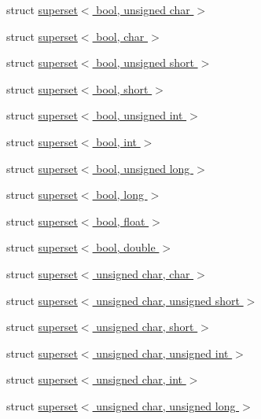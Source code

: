 \begin{DoxyCompactItemize}
struct \hyperlink{structcimg__library_1_1cimg_1_1superset_3_01bool_00_01unsigned_01char_01_4}{superset$<$ bool, unsigned char $>$}
\item 
struct \hyperlink{structcimg__library_1_1cimg_1_1superset_3_01bool_00_01char_01_4}{superset$<$ bool, char $>$}
\item 
struct \hyperlink{structcimg__library_1_1cimg_1_1superset_3_01bool_00_01unsigned_01short_01_4}{superset$<$ bool, unsigned short $>$}
\item 
struct \hyperlink{structcimg__library_1_1cimg_1_1superset_3_01bool_00_01short_01_4}{superset$<$ bool, short $>$}
\item 
struct \hyperlink{structcimg__library_1_1cimg_1_1superset_3_01bool_00_01unsigned_01int_01_4}{superset$<$ bool, unsigned int $>$}
\item 
struct \hyperlink{structcimg__library_1_1cimg_1_1superset_3_01bool_00_01int_01_4}{superset$<$ bool, int $>$}
\item 
struct \hyperlink{structcimg__library_1_1cimg_1_1superset_3_01bool_00_01unsigned_01long_01_4}{superset$<$ bool, unsigned long $>$}
\item 
struct \hyperlink{structcimg__library_1_1cimg_1_1superset_3_01bool_00_01long_01_4}{superset$<$ bool, long $>$}
\item 
struct \hyperlink{structcimg__library_1_1cimg_1_1superset_3_01bool_00_01float_01_4}{superset$<$ bool, float $>$}
\item 
struct \hyperlink{structcimg__library_1_1cimg_1_1superset_3_01bool_00_01double_01_4}{superset$<$ bool, double $>$}
\item 
struct \hyperlink{structcimg__library_1_1cimg_1_1superset_3_01unsigned_01char_00_01char_01_4}{superset$<$ unsigned char, char $>$}
\item 
struct \hyperlink{structcimg__library_1_1cimg_1_1superset_3_01unsigned_01char_00_01unsigned_01short_01_4}{superset$<$ unsigned char, unsigned short $>$}
\item 
struct \hyperlink{structcimg__library_1_1cimg_1_1superset_3_01unsigned_01char_00_01short_01_4}{superset$<$ unsigned char, short $>$}
\item 
struct \hyperlink{structcimg__library_1_1cimg_1_1superset_3_01unsigned_01char_00_01unsigned_01int_01_4}{superset$<$ unsigned char, unsigned int $>$}
\item 
struct \hyperlink{structcimg__library_1_1cimg_1_1superset_3_01unsigned_01char_00_01int_01_4}{superset$<$ unsigned char, int $>$}
\item 
struct \hyperlink{structcimg__library_1_1cimg_1_1superset_3_01unsigned_01char_00_01unsigned_01long_01_4}{superset$<$ unsigned char, unsigned long $>$}

\end{DoxyCompactItemize}
